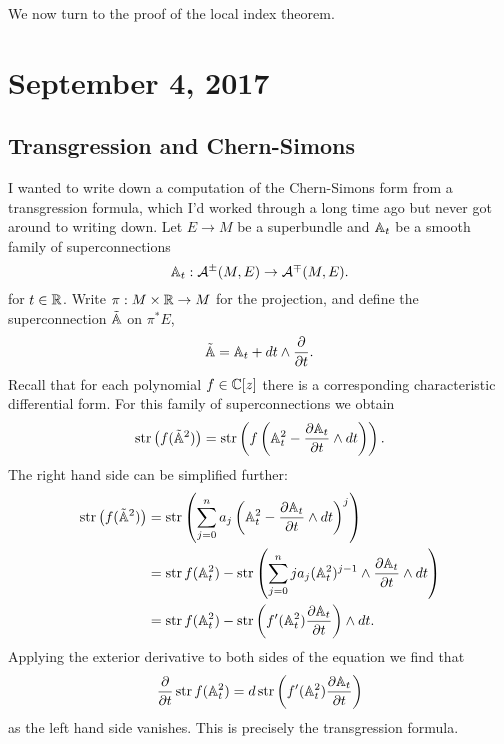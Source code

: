 \documentclass{amsart}
\begin{document}
We now turn to the proof of the local index theorem.


\section{September 4, 2017}

\subsection{Transgression and Chern-Simons}

I wanted to write down a computation of the Chern-Simons form
from a transgression formula, which I'd worked through a long time ago but
never got around to writing down. Let $E\to M$
be a superbundle and $\mathbb{A}_t$ be a smooth family of superconnections
\begin{equation*}
    \mathbb{A}_t: \mathcal{A}^\pm (M,E) \to \mathcal{A}^\mp(M,E).
\end{equation*}
for $t\in\mathbb{R}$. Write $\pi:M\times\mathbb{R}\to M$ for the projection, and define the
superconnection $\tilde{\mathbb{A}}$ on $\pi^*E$,
\begin{equation*}
    \tilde{\mathbb{A}} = \mathbb{A}_t + dt\wedge \frac{\partial}{\partial t}.
\end{equation*}
Recall that for each polynomial $f\in\mathbb{C}[z]$ there is a corresponding characteristic
differential form. For this family of superconnections we obtain
\begin{equation*}
    \operatorname{str}\left(f(\tilde {\mathbb{A}}^2)\right) = \operatorname{str}\left(f\left(\mathbb{A}_t^2 - \frac{\partial \mathbb{A}_t}{\partial t}\wedge dt\right)\right).
\end{equation*}
The right hand side can be simplified further:
\begin{align*}
    \operatorname{str}\left( f(\tilde{\mathbb{A}}^2) \right) &= \operatorname{str}\left(\sum_{j=0}^n a_j\left(\mathbb{A}_t^2-\frac{\partial \mathbb{A}_t}{\partial t}\wedge dt\right)^j\right)\\
    &= \operatorname{str} f(\mathbb{A}_t^2) - \operatorname{str}\left(\sum_{j=0}^n ja_j(\mathbb{A}_t^2)^{j-1}\wedge \frac{\partial \mathbb{A}_t}{\partial t}\wedge dt\right)\\
    &= \operatorname{str} f(\mathbb{A}_t^2) - \operatorname{str}\left( f'(\mathbb{A}_t^2)\frac{\partial \mathbb{A}_t}{\partial t}\right)\wedge dt.
\end{align*}
Applying the exterior derivative to both sides of the equation we find
that
\begin{equation*}
    \frac{\partial}{\partial t}\operatorname{str} f(\mathbb{A}_t^2)= d\operatorname{str}\left( f'(\mathbb{A}_t^2)\frac{\partial\mathbb{A}_t}{\partial t}\right)
\end{equation*}
as the left hand side vanishes. This is precisely the transgression formula.
\end{document}
